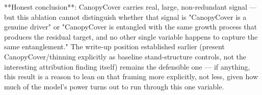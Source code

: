 **Honest conclusion**: CanopyCover carries real, large, non-redundant signal — but this ablation
cannot distinguish whether that signal is "CanopyCover is a genuine driver" or "CanopyCover is
entangled with the same growth process that produces the residual target, and no other single
variable happens to capture the same entanglement." The write-up position established earlier
(present CanopyCover/thinning explicitly as baseline stand-structure controls, not the interesting
attribution finding itself) remains the defensible one — if anything, this result is a reason to
lean on that framing more explicitly, not less, given how much of the model's power turns out to
run through this one variable.
